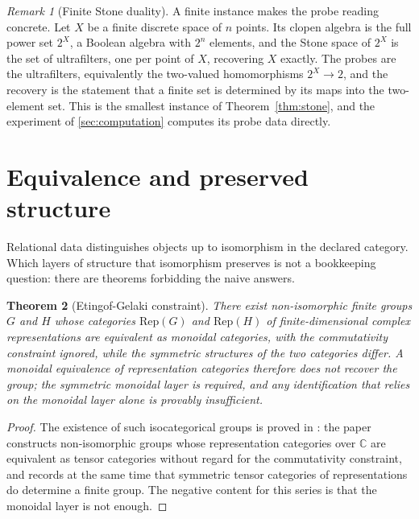 \documentclass[11pt,letterpaper]{article}
\newtheorem{theorem}{Theorem}[section]
\theoremstyle{definition}
\theoremstyle{remark}
\newtheorem{remark}[theorem]{Remark}
\begin{document}
\begin{remark}[Finite Stone duality]
\label{rem:finestone}
A finite instance makes the probe reading concrete. Let $X$ be a finite discrete space of $n$ points. Its clopen algebra is the full power set $2^X$, a Boolean algebra with $2^{n}$ elements, and the Stone space of $2^{X}$ is the set of ultrafilters, one per point of $X$, recovering $X$ exactly. The probes are the ultrafilters, equivalently the two-valued homomorphisms $2^X \to 2$, and the recovery is the statement that a finite set is determined by its maps into the two-element set. This is the smallest instance of Theorem~\ref{thm:stone}, and the experiment of \cref{sec:computation} computes its probe data directly.
\end{remark}

\section{Equivalence and preserved structure}
\label{sec:equivalence}

Relational data distinguishes objects up to isomorphism in the declared category. Which layers of structure that isomorphism preserves is not a bookkeeping question: there are theorems forbidding the naive answers.

\begin{theorem}[Etingof-Gelaki constraint]
\label{thm:eg}
There exist non-isomorphic finite groups $G$ and $H$ whose categories $\mathrm{Rep}(G)$ and $\mathrm{Rep}(H)$ of finite-dimensional complex representations are equivalent as monoidal categories, with the commutativity constraint ignored, while the symmetric structures of the two categories differ. A monoidal equivalence of representation categories therefore does not recover the group; the symmetric monoidal layer is required, and any identification that relies on the monoidal layer alone is provably insufficient.
\end{theorem}

\begin{proof}
The existence of such isocategorical groups is proved in \cite{eg}: the paper constructs non-isomorphic groups whose representation categories over $\mathbb{C}$ are equivalent as tensor categories without regard for the commutativity constraint, and records at the same time that symmetric tensor categories of representations do determine a finite group. The negative content for this series is that the monoidal layer is not enough.
\end{proof}
\end{document}
